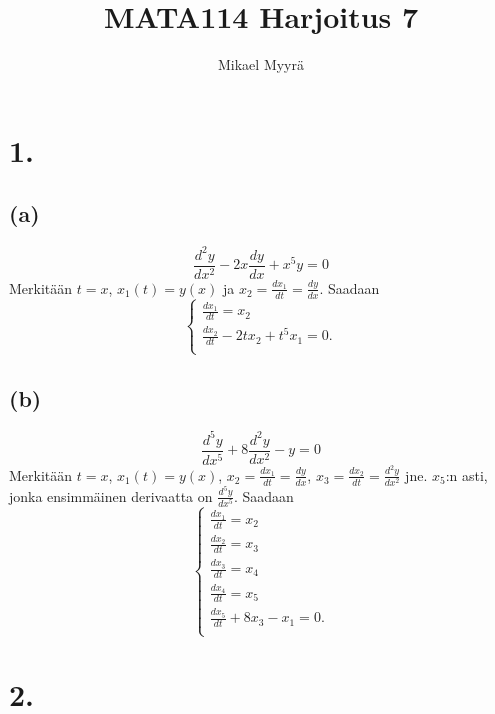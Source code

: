 \documentclass{article}
\title{MATA114 Harjoitus 7}
\author{Mikael Myyrä}
\date{}
\begin{document}
\maketitle

\section*{1.}

\subsection*{(a)}

\[
  \frac{d^2 y}{d x^2} - 2x\frac{dy}{dx} + x^5y = 0
\]
Merkitään $t = x$, $x_1(t) = y(x)$ ja $x_2 = \frac{dx_1}{dt} = \frac{dy}{dx}$.
Saadaan
\[
  \begin{cases}
    \frac{dx_1}{dt} = x_2 \\
    \frac{dx_2}{dt} - 2tx_2 + t^5x_1 = 0. \\
  \end{cases}
\]

\subsection*{(b)}

\[
  \frac{d^5 y}{d x^5} + 8\frac{d^2 y}{d x^2} - y = 0
\]
Merkitään $t = x$, $x_1(t) = y(x)$, $x_2 = \frac{dx_1}{dt} = \frac{dy}{dx}$,
$x_3 = \frac{dx_2}{dt} = \frac{d^2 y}{d x^2}$ jne. $x_5$:n asti, jonka
ensimmäinen derivaatta on $\frac{d^5 y}{d x^5}$.
Saadaan
\[
  \begin{cases}
    \frac{dx_1}{dt} = x_2 \\
    \frac{dx_2}{dt} = x_3 \\
    \frac{dx_3}{dt} = x_4 \\
    \frac{dx_4}{dt} = x_5 \\
    \frac{dx_5}{dt} + 8x_3 - x_1 = 0. \\
  \end{cases}
\]

\section*{2.}
\end{document}
